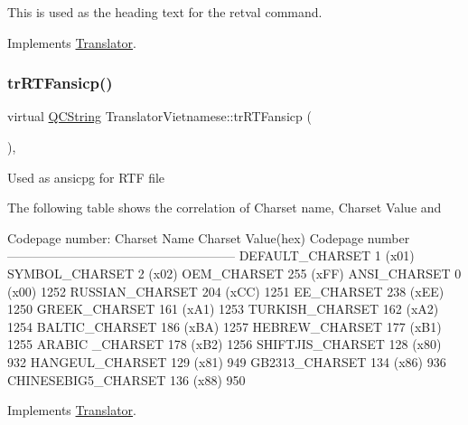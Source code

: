 This is used as the heading text for the retval command. 

Implements \mbox{\hyperlink{class_translator}{Translator}}.

\mbox{\label{class_translator_vietnamese_ac4cd9cfaabff4434e80e30001ae14b01}} 
\subsubsection{\texorpdfstring{trRTFansicp()}{trRTFansicp()}}
{\footnotesize\ttfamily virtual \mbox{\hyperlink{class_q_c_string}{Q\+C\+String}} Translator\+Vietnamese\+::tr\+R\+T\+Fansicp (\begin{DoxyParamCaption}{ }\end{DoxyParamCaption})\hspace{0.3cm}{\ttfamily [inline]}, {\ttfamily [virtual]}}

Used as ansicpg for R\+TF file

The following table shows the correlation of Charset name, Charset Value and 
\begin{DoxyPre}
Codepage number:
Charset Name       Charset Value(hex)  Codepage number
------------------------------------------------------
DEFAULT\_CHARSET           1 (x01)
SYMBOL\_CHARSET            2 (x02)
OEM\_CHARSET             255 (xFF)
ANSI\_CHARSET              0 (x00)            1252
RUSSIAN\_CHARSET         204 (xCC)            1251
EE\_CHARSET              238 (xEE)            1250
GREEK\_CHARSET           161 (xA1)            1253
TURKISH\_CHARSET         162 (xA2)            1254
BALTIC\_CHARSET          186 (xBA)            1257
HEBREW\_CHARSET          177 (xB1)            1255
ARABIC \_CHARSET         178 (xB2)            1256
SHIFTJIS\_CHARSET        128 (x80)             932
HANGEUL\_CHARSET         129 (x81)             949
GB2313\_CHARSET          134 (x86)             936
CHINESEBIG5\_CHARSET     136 (x88)             950
\end{DoxyPre}
 

Implements \mbox{\hyperlink{class_translator_a9953a4c0e6a4fc7d017abcd5c2939e0f}{Translator}}.

\mbox{\label{class_translator_vietnamese_a52525532126029fabe558afdebd1b119}} 

